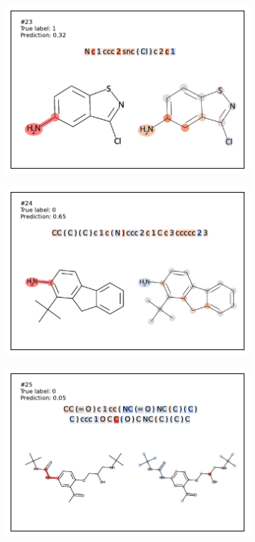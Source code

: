 \begin{figure}
\begin{subfigure}[b]{0.33\textwidth}
\end{subfigure} 
\begin{subfigure}[b]{0.33\textwidth} 
  \centering 
  \includegraphics[width=\textwidth]{figures/ames/ames23.pdf} 
\end{subfigure}\begin{subfigure}[b]{0.33\textwidth} 
  \centering 
  \includegraphics[width=\textwidth]{figures/ames/ames24.pdf} 
\end{subfigure}\begin{subfigure}[b]{0.33\textwidth} 
  \centering 
  \includegraphics[width=\textwidth]{figures/ames/ames25.pdf} 

\end{subfigure}
\end{figure}
